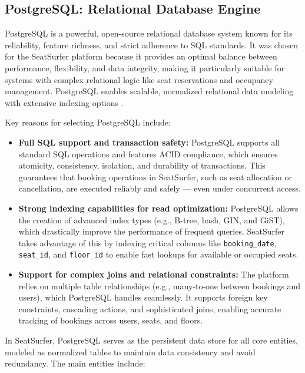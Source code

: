 \documentclass[12pt,a4paper]{report} %
\begin{document}
\subsection{PostgreSQL: Relational Database Engine}

PostgreSQL is a powerful, open-source relational database system known for its reliability, feature richness, and strict adherence to SQL standards. It was chosen for the SeatSurfer platform because it provides an optimal balance between performance, flexibility, and data integrity, making it particularly suitable for systems with complex relational logic like seat reservations and occupancy management. PostgreSQL enables scalable, normalized relational data modeling with extensive indexing options \cite{postgresql2023docs}.

Key reasons for selecting PostgreSQL include:

\begin{itemize}
\item \textbf{Full SQL support and transaction safety:} PostgreSQL supports all standard SQL operations and features ACID compliance, which ensures atomicity, consistency, isolation, and durability of transactions. This guarantees that booking operations in SeatSurfer, such as seat allocation or cancellation, are executed reliably and safely — even under concurrent access.
\item \textbf{Strong indexing capabilities for read optimization:} PostgreSQL allows the creation of advanced index types (e.g., B-tree, hash, GIN, and GiST), which drastically improve the performance of frequent queries. SeatSurfer takes advantage of this by indexing critical columns like \texttt{booking\_date}, \texttt{seat\_id}, and \texttt{floor\_id} to enable fast lookups for available or occupied seats.
\item \textbf{Support for complex joins and relational constraints:} The platform relies on multiple table relationships (e.g., many-to-one between bookings and users), which PostgreSQL handles seamlessly. It supports foreign key constraints, cascading actions, and sophisticated joins, enabling accurate tracking of bookings across users, seats, and floors.
\end{itemize}

In SeatSurfer, PostgreSQL serves as the persistent data store for all core entities, modeled as normalized tables to maintain data consistency and avoid redundancy. The main entities include:
\end{document}
